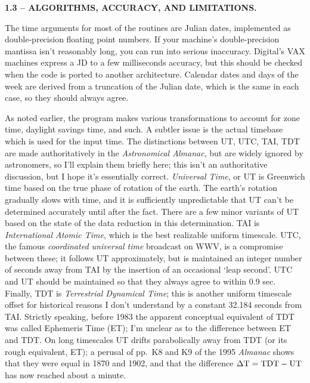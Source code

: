 \par\vfill\eject
\centerline{\bf 1.3 -- ALGORITHMS, ACCURACY, AND LIMITATIONS.}
\medskip
{}
\par
The time arguments for most of the routines are Julian dates, implemented as
double-precision floating point numbers.  If your machine's double-precision 
mantissa isn't reasonably long, you can run into serious inaccuracy.  
Digital's VAX machines express a JD to a few milliseconds accuracy, but
this should be checked when the code is ported to another architecture.  
Calendar dates and days of the week are derived from a truncation of the 
Julian date, which is the same in each case, so they should always agree.  
\par
As noted earlier, the program makes various transformations to account
for zone time, daylight savings time, and such.  A subtler issue is the
actual timebase which is used for the input time.  The distinctions
between UT, UTC, TAI, TDT are made authoritatively in the 
{\it Astronomical Almanac}, but are widely ignored by astronomers, so
I'll explain them briefly here; this isn't an authoritative 
discussion, but I hope it's essentially correct.  
{\sl Universal Time}, or UT
is Greenwich time based on the true
phase of rotation of the earth.  The earth's rotation gradually
slows with time, and it is 
sufficiently unpredictable that UT can't be 
determined accurately until after the fact.  There are a few
minor variants of UT based on the state of the data reduction in this
determination.
TAI is {\sl International Atomic Time}, which
is the best realizable uniform timescale.  UTC, the famous {\sl coordinated
universal time} broadcast on WWV, is a compromise between these;
it follows UT approximately, but is maintained an 
integer number of seconds away from TAI by the insertion of an
occasional `leap second'.  UTC and UT should be maintained so that
they always agree to within 0.9 sec.  Finally, TDT is {\sl Terrestrial
Dynamical Time}; this is another uniform timescale offset for historical
reasons I don't understand by a constant 32.184 seconds from TAI.  
Strictly speaking, before 1983
the apparent conceptual equivalent of TDT was called Ephemeris Time (ET); I'm
unclear as to the difference between ET and TDT.  On long timescales
UT drifts parabolically away from TDT (or its rough equivalent, ET); 
a perusal of 
pp.~K8 and K9 of the 1995 {\it Almanac} shows that they were equal in 1870
and 1902, and that the difference $\rm \Delta T = TDT - UT$ has now 
reached about a minute.

